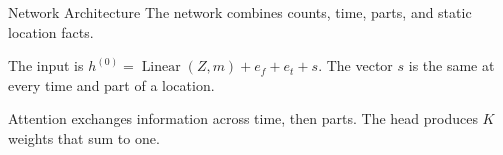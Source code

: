 \begin{frame}{Network Architecture}
\TightMath
The network combines counts, time, parts, and static location facts.
\begin{KeyPoints}
\item The input is $h^{(0)}=\operatorname{Linear}(Z,m)+e_f+e_t+s$. The vector $s$ is the same at every time and part of a location.
\item Attention exchanges information across time, then parts. The head produces $K$ weights that sum to one.
\end{KeyPoints}
\end{frame}

